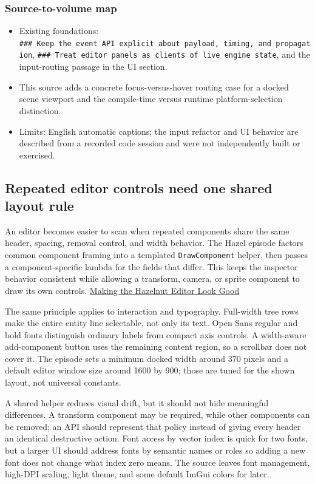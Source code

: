 \subsubsection{Source-to-volume map}\label{06-engine-ii-ch032-source-to-volume-map-2}

\begin{itemize}
\tightlist
\item
  Existing foundations: \texttt{\#\#\#\ Keep\ the\ event\ API\ explicit\ about\ payload,\ timing,\ and\ propagation}, \texttt{\#\#\#\ Treat\ editor\ panels\ as\ clients\ of\ live\ engine\ state}, and the input-routing passage in the UI section.
\item
  This source adds a concrete focus-versus-hover routing case for a docked scene viewport and the compile-time versus runtime platform-selection distinction.
\item
  Limits: English automatic captions; the input refactor and UI behavior are described from a recorded code session and were not independently built or exercised.
\end{itemize}

\subsection{Repeated editor controls need one shared layout rule}\label{06-engine-ii-ch032-repeated-editor-controls-need-one-shared-layout-rule}

An editor becomes easier to scan when repeated components share the same header, spacing, removal control, and width behavior. The Hazel episode factors common component framing into a templated \texttt{DrawComponent} helper, then passes a component-specific lambda for the fields that differ. This keeps the inspector behavior consistent while allowing a transform, camera, or sprite component to draw its own controls. \href{https://www.youtube.com/watch?v=oESRecjuLNY}{Making the Hazelnut Editor Look Good}

The same principle applies to interaction and typography. Full-width tree rows make the entire entity line selectable, not only its text. Open Sans regular and bold fonts distinguish ordinary labels from compact axis controls. A width-aware add-component button uses the remaining content region, so a scrollbar does not cover it. The episode sets a minimum docked width around 370 pixels and a default editor window size around 1600 by 900; those are tuned for the shown layout, not universal constants.

A shared helper reduces visual drift, but it should not hide meaningful differences. A transform component may be required, while other components can be removed; an API should represent that policy instead of giving every header an identical destructive action. Font access by vector index is quick for two fonts, but a larger UI should address fonts by semantic names or roles so adding a new font does not change what index zero means. The source leaves font management, high-DPI scaling, light theme, and some default ImGui colors for later.

